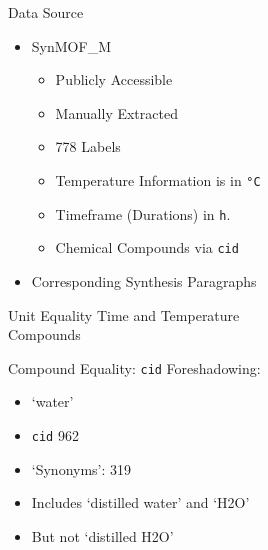 \begin{frame}[c]{Data Source}
    \Large
    \begin{itemize}[<+(1)->]
        \item SynMOF\_M \cite{luo_mof_2022}
            \begin{itemize}[<+(1)->]
                \large
                \item Publicly Accessible
                \item Manually Extracted
                \item 778 Labels
                \item Temperature Information is in \texttt{°C}
                \item Timeframe (Durations) in \texttt{h}.
                \item Chemical Compounds via \texttt{cid}
            \end{itemize}
        \item Corresponding Synthesis Paragraphs 
    \end{itemize}
\end{frame}


\begin{frame}[c]{Unit Equality}
    Time and Temperature \\
    Compounds
\end{frame}


\begin{frame}[c]{Compound Equality: \texttt{cid}}
    \large
    Foreshadowing:
    \begin{itemize}[<+(1)->]
        \item `water'
        \item \texttt{cid} 962
        \item `Synonyms': 319
        \item Includes `distilled water' and `H2O'
        \item But not `distilled H2O' 
    \end{itemize}
\end{frame}
